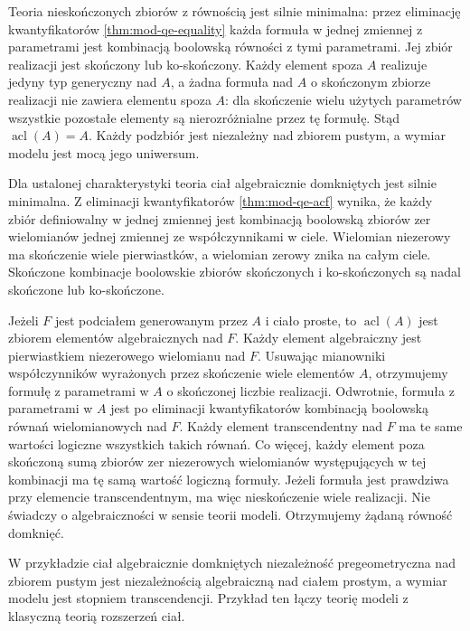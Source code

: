 \begin{przyklad}
\label{ex:mod-strong-minimal-equality}
Teoria nieskończonych zbiorów z równością
jest silnie minimalna: przez eliminację
kwantyfikatorów \ref{thm:mod-qe-equality}
każda formuła w jednej zmiennej z parametrami
jest kombinacją boolowską równości z tymi
parametrami. Jej zbiór realizacji jest skończony
lub ko-skończony.
Każdy element spoza $A$ realizuje jedyny
typ generyczny nad $A$, a żadna formuła nad $A$
o skończonym zbiorze realizacji nie zawiera
elementu spoza $A$: dla skończenie wielu
użytych parametrów wszystkie pozostałe
elementy są nierozróżnialne przez tę formułę.
Stąd $\operatorname{acl}(A)=A$.
Każdy podzbiór jest niezależny nad zbiorem
pustym, a wymiar modelu jest mocą jego uniwersum.
\end{przyklad}

\begin{przyklad}
\label{ex:mod-strong-minimal-acf}
Dla ustalonej charakterystyki teoria ciał
algebraicznie domkniętych jest silnie minimalna.
Z eliminacji kwantyfikatorów
\ref{thm:mod-qe-acf} wynika, że każdy zbiór
definiowalny w jednej zmiennej jest kombinacją
boolowską zbiorów zer wielomianów jednej
zmiennej ze współczynnikami w ciele.
Wielomian niezerowy ma skończenie wiele
pierwiastków, a wielomian zerowy znika
na całym ciele. Skończone kombinacje
boolowskie zbiorów skończonych i ko-skończonych
są nadal skończone lub ko-skończone.

Jeżeli $F$ jest podciałem generowanym przez
$A$ i ciało proste, to $\operatorname{acl}(A)$
jest zbiorem elementów algebraicznych nad $F$.
Każdy element algebraiczny jest pierwiastkiem
niezerowego wielomianu nad $F$.
Usuwając mianowniki współczynników wyrażonych
przez skończenie wiele elementów $A$,
otrzymujemy formułę z parametrami w $A$
o skończonej liczbie realizacji.
Odwrotnie, formuła z parametrami w $A$
jest po eliminacji kwantyfikatorów kombinacją
boolowską równań wielomianowych nad $F$.
Każdy element transcendentny nad $F$ ma
te same wartości logiczne wszystkich
takich równań. Co więcej, każdy element
poza skończoną sumą zbiorów zer niezerowych
wielomianów występujących w tej kombinacji
ma tę samą wartość logiczną formuły.
Jeżeli formuła jest prawdziwa przy elemencie
transcendentnym, ma więc nieskończenie wiele
realizacji. Nie świadczy o algebraiczności
w sensie teorii modeli.
Otrzymujemy żądaną równość domknięć.
\end{przyklad}

W przykładzie ciał algebraicznie domkniętych
niezależność pregeometryczna nad zbiorem pustym
jest niezależnością algebraiczną nad ciałem
prostym, a wymiar modelu jest stopniem
transcendencji. Przykład ten łączy teorię modeli
z klasyczną teorią rozszerzeń ciał.

